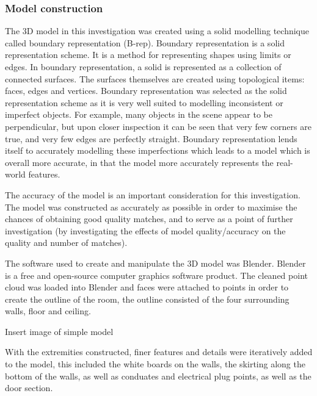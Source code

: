 \documentclass[11pt,a4paper]{report}
\begin{document}
			\subsubsection{Model construction}
				The 3D model in this investigation was created using a solid modelling technique called boundary representation (B-rep). Boundary representation is a solid representation scheme. It is a method for representing shapes using limits or edges. In boundary representation, a solid is represented as a collection of connected surfaces. The surfaces themselves are created using topological items: faces, edges and vertices.
				\cite{hongxin_zhang_introduction_2007}
				Boundary representation was selected as the solid representation scheme as it is very well suited to modelling inconsistent or imperfect objects. For example, many objects in the scene appear to be perpendicular, but upon closer inspection it can be seen that very few corners are true, and very few edges are perfectly straight. Boundary representation lends itself to accurately modelling these imperfections which leads to a model which is overall more accurate, in that the model more accurately represents the real-world features.
				
				The accuracy of the model is an important consideration for this investigation. The model was constructed as accurately as possible in order to maximise the chances of obtaining good quality matches, and to serve as a point of further investigation (by investigating the effects of model quality/accuracy on the quality and number of matches).
				
				The software used to create and manipulate the 3D model was Blender. Blender is a free and open-source computer graphics software product. The cleaned point cloud was loaded into Blender and faces were attached to points in order to create the outline of the room, the outline consisted of the four surrounding walls, floor and ceiling. 
				
				{Insert image of simple model}
				
				With the extremities constructed, finer features and details were iteratively added to the model, this included the white boards on the walls, the skirting along the bottom of the walls, as well as conduates and electrical plug points, as well as the door section.
				
\end{document}
